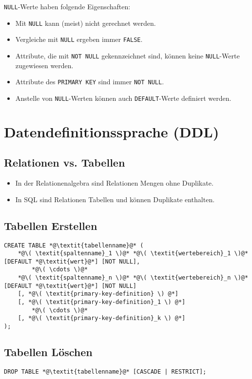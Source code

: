 			\lstinline|NULL|-Werte haben folgende Eigenschaften:
			\begin{itemize}
				\item Mit \lstinline|NULL| kann (meist) nicht gerechnet werden.
				\item Vergleiche mit \lstinline|NULL| ergeben immer \lstinline|FALSE|.
				\item Attribute, die mit \lstinline|NOT NULL| gekennzeichnet sind, können keine \lstinline|NULL|-Werte zugewiesen werden.
				\item Attribute des \lstinline|PRIMARY KEY| sind immer \lstinline|NOT NULL|.
				\item Anstelle von \lstinline|NULL|-Werten können auch \lstinline|DEFAULT|-Werte definiert werden.
			\end{itemize}

	\section{Datendefinitionssprache (DDL)} %
		\subsection{Relationen vs. Tabellen} %
			\begin{itemize}
				\item In der Relationenalgebra sind Relationen Mengen ohne Duplikate.
				\item In SQL sind Relationen Tabellen und können Duplikate enthalten.
			\end{itemize}

		\subsection{Tabellen Erstellen} %
			\begin{lstlisting}
CREATE TABLE *@\textit{tabellenname}@* (
	*@\( \textit{spaltenname}_1 \)@* *@\( \textit{wertebereich}_1 \)@* [DEFAULT *@\textit{wert}@*] [NOT NULL],
		*@\( \cdots \)@*
	*@\( \textit{spaltenname}_n \)@* *@\( \textit{wertebereich}_n \)@* [DEFAULT *@\textit{wert}@*] [NOT NULL]
	[, *@\( \textit{primary-key-definition} \) @*]
	[, *@\( \textit{primary-key-definition}_1 \) @*]
		*@\( \cdots \)@*
	[, *@\( \textit{primary-key-definition}_k \) @*]
);
            \end{lstlisting}

		\subsection{Tabellen Löschen} %
			\begin{lstlisting}
DROP TABLE *@\textit{tabellenname}@* [CASCADE | RESTRICT];
            \end{lstlisting}

